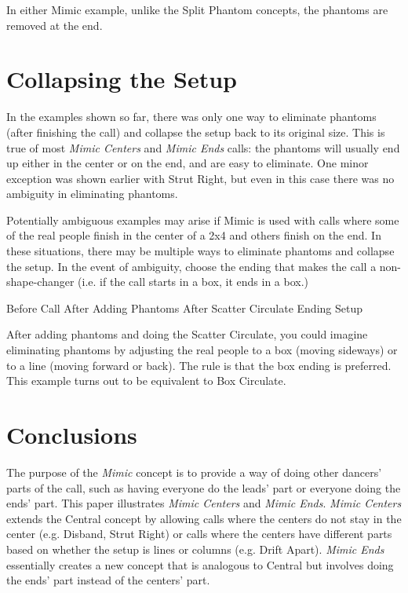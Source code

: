 \documentclass[12pt]{article}
\begin{document}
In either Mimic example, unlike the Split Phantom concepts,
the phantoms are removed at the end.

\section{Collapsing the Setup}

In the examples shown so far, there was only one way to eliminate
phantoms (after finishing the call) and collapse the setup
back to its original size.
This is true of most \emph{Mimic Centers} and \emph{Mimic Ends} calls:
the phantoms will usually end up either in the center or on the end,
and are easy to eliminate.  One minor exception was shown earlier with
Strut Right, but even in this case there was no ambiguity in eliminating
phantoms.

Potentially ambiguous examples may arise if Mimic is used with calls
where some of the real people finish in the center of a 2x4 and others finish
on the end.  In these situations, there may be multiple ways to
eliminate phantoms and collapse the setup.  In the
event of ambiguity, choose the ending that
makes the call a non-shape-changer (i.e. if the call starts in a box,
it ends in a box.)

\displayfour
{\cr
 }
{Before Call}
{\cr
 }
{After Adding Phantoms}
{\cr
 }
{After Scatter Circulate}
{\cr
 }
{Ending Setup}
\endexample

After adding phantoms and doing the Scatter Circulate, you could imagine
eliminating phantoms by adjusting the real people to a box (moving
sideways) or to a line (moving forward or back).  The rule is
that the box ending is preferred.  This example turns
out to be equivalent to Box Circulate.

\section{Conclusions}

The purpose of the \emph{Mimic} concept is to provide a way of
doing other dancers' parts of the call, such as having everyone
do the leads' part or everyone doing the ends' part.
This paper illustrates \emph{Mimic Centers} and \emph{Mimic Ends}.
\emph{Mimic Centers} extends the Central concept by allowing calls where
the centers do not stay in the center (e.g. Disband, Strut Right) or
calls where the centers have different parts based on whether the setup
is lines or columns (e.g. Drift Apart).  \emph{Mimic Ends} essentially
creates a new concept that is analogous to Central but involves doing
the ends' part instead of the centers' part.
\end{document}
